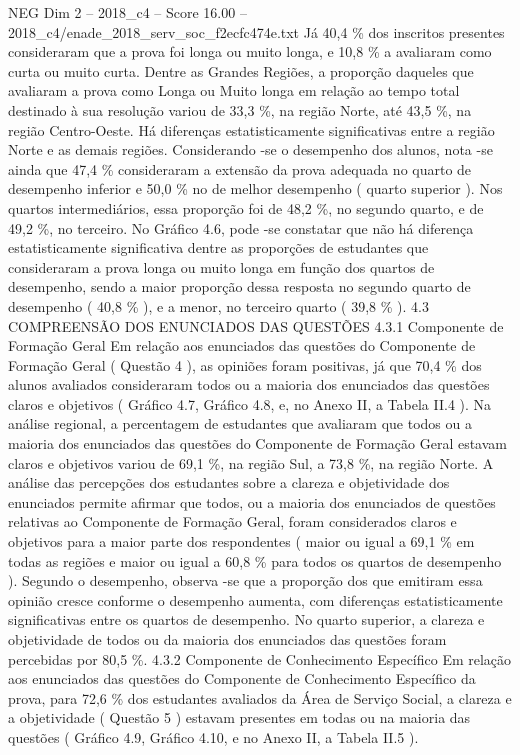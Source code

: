 \begin{textsample}{NEG Dim 2 – 2018\_c4 – Score 16.00 – 2018\_c4/enade\_2018\_serv\_soc\_f2ecfc474e.txt}
Já 40,4 \% dos inscritos presentes consideraram que a prova foi longa ou muito longa, e 10,8 \% a avaliaram como curta ou muito curta.
Dentre as Grandes Regiões, a proporção daqueles que avaliaram a prova como Longa ou Muito longa em relação ao tempo total destinado à sua resolução variou de 33,3 \%, na região Norte, até 43,5 \%, na região Centro-Oeste.
Há diferenças estatisticamente significativas entre a região Norte e as demais regiões.
Considerando -se o desempenho dos alunos, nota -se ainda que 47,4 \% consideraram a extensão da prova adequada no quarto de desempenho inferior e 50,0 \% no de melhor desempenho ( quarto superior ).
Nos quartos intermediários, essa proporção foi de 48,2 \%, no segundo quarto, e de 49,2 \%, no terceiro.
No Gráfico 4.6, pode -se constatar que não há diferença estatisticamente significativa dentre as proporções de estudantes que consideraram a prova longa ou muito longa em função dos quartos de desempenho, sendo a maior proporção dessa resposta no segundo quarto de desempenho ( 40,8 \% ), e a menor, no terceiro quarto ( 39,8 \% ). 4.3 COMPREENSÃO DOS ENUNCIADOS DAS QUESTÕES 4.3.1 Componente de Formação Geral Em relação aos enunciados das questões do Componente de Formação Geral ( Questão 4 ), as opiniões foram positivas, já que 70,4 \% dos alunos avaliados consideraram todos ou a maioria dos enunciados das questões claros e objetivos ( Gráfico 4.7, Gráfico 4.8, e, no Anexo II, a Tabela II.4 ).
Na análise regional, a percentagem de estudantes que avaliaram que todos ou a maioria dos enunciados das questões do Componente de Formação Geral estavam claros e objetivos variou de 69,1 \%, na região Sul, a 73,8 \%, na região Norte.
A análise das percepções dos estudantes sobre a clareza e objetividade dos enunciados permite afirmar que todos, ou a maioria dos enunciados de questões relativas ao Componente de Formação Geral, foram considerados claros e objetivos para a maior parte dos respondentes ( maior ou igual a 69,1 \% em todas as regiões e maior ou igual a 60,8 \% para todos os quartos de desempenho ).
Segundo o desempenho, observa -se que a proporção dos que emitiram essa opinião cresce conforme o desempenho aumenta, com diferenças estatisticamente significativas entre os quartos de desempenho.
No quarto superior, a clareza e objetividade de todos ou da maioria dos enunciados das questões foram percebidas por 80,5 \%. 4.3.2 Componente de Conhecimento Específico Em relação aos enunciados das questões do Componente de Conhecimento Específico da prova, para 72,6 \% dos estudantes avaliados da Área de Serviço Social, a clareza e a objetividade ( Questão 5 ) estavam presentes em todas ou na maioria das questões ( Gráfico 4.9, Gráfico 4.10, e no Anexo II, a Tabela II.5 ).

\end{textsample}
